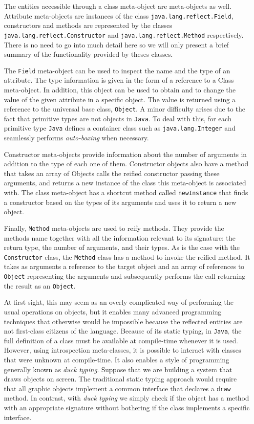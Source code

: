 The entities accessible through a class meta-object are meta-objects as well. Attribute meta-objects are instances of the class
\texttt{java.lang.reflect.Field}, constructors and methods are represented by the classes \texttt{java.lang.reflect.Constructor} and \texttt{java.lang.reflect.Method}
respectively. There is no need to go into much detail here so we will only present a brief summary of the functionality provided
by theses classes.

The \texttt{Field} meta-object can be used to inspect the name and the type of an attribute. The type information is given in the form of
a reference to a Class meta-object. In addition, this object can be used to obtain and to change the value of the given attribute in
a specific object. The value is returned using a reference to the universal base class, \texttt{Object}. A minor difficulty arises due to the
fact that primitive types are not objects in \texttt{Java}. To deal with this, for each primitive type \texttt{Java} defines a container class such
as \texttt{java.lang.Integer} and seamlessly performs \emph{auto-boxing} when necessary.

Constructor meta-objects provide information about the number of arguments in addition to the type of each one of them. Constructor
objects also have a method that takes an array of Objects calls the reified constructor passing these arguments, and returns a new
instance of the class this meta-object is associated with. The class meta-object has a shortcut method called \texttt{newInstance}
that finds a constructor based on the types of its arguments and uses it to return a new object.

Finally, \texttt{Method} meta-objects are used to reify methods. They provide the methods name together with all the information relevant to
its signature: the return type, the number of arguments, and their types. As is the case with the \texttt{Constructor} class, the \texttt{Method}
class has a method to invoke the reified method. It takes as arguments a reference to the target object and an array of references
to \texttt{Object} representing the arguments and subsequently performs the call returning the result as an \texttt{Object}.

At first sight, this may seem as an overly complicated way of performing the usual operations on objects, but it enables many
advanced programming techniques that otherwise would be impossible because the reflected entities are not first-class citizens
of the language. Because of its static typing, in \texttt{Java}, the full definition of a class must be available at
compile-time whenever it is used. However, using introspection meta-classes, it is possible to interact with classes that
were unknown at compile-time. It also enables a style of programming generally known as \emph{duck typing}. Suppose that
we are building a system that draws objects on screen. The traditional static typing approach
would require that all graphic objects implement a common interface that declares a \texttt{draw} method. In contrast, with
\emph{duck typing} we simply check if the object has a method with an appropriate signature without bothering if the class
implements a specific interface.

